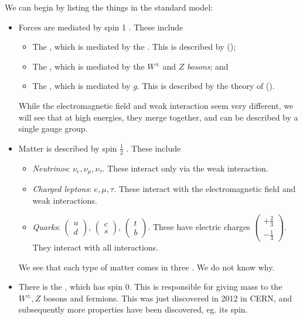 \documentclass[a4paper]{article}
\begin{document}
We can begin by listing the things in the standard model:
\begin{itemize}
  \item Forces are mediated by spin 1 . These include
    \begin{itemize}
      \item The , which is mediated by the . This is described by  ();
      \item The , which is mediated by the $W^{\pm}$ and $Z$ \emph{bosons}; and
      \item The , which is mediated by  $g$. This is described by the theory of  ().
    \end{itemize}
    While the electromagnetic field and weak interaction seem very different, we will see that at high energies, they merge together, and can be described by a single gauge group.
  \item Matter is described by spin $\frac{1}{2}$ . These include
    \begin{itemize}
      \item \emph{Neutrinos}: $\nu_e, \nu_\mu, \nu_\tau$. These interact only via the weak interaction.
      \item \emph{Charged leptons}: $e, \mu, \tau$. These interact with the electromagnetic field and weak interactions.
      \item \emph{Quarks}: $\begin{pmatrix}u\\d\end{pmatrix}$, $\begin{pmatrix}c\\s\end{pmatrix}$, $\begin{pmatrix}t\\b\end{pmatrix}$. These have electric charges $\begin{pmatrix}+\frac{2}{3}\\ -\frac{1}{3}\end{pmatrix}$. They interact with all interactions.
    \end{itemize}
    We see that each type of matter comes in three . We do not know why.
  \item There is the , which has spin 0. This is responsible for giving mass to the $W^{\pm}, Z$ bosons and fermions. This was just discovered in 2012 in CERN, and subsequently more properties have been discovered, eg. its spin.
\end{itemize}
\end{document}
